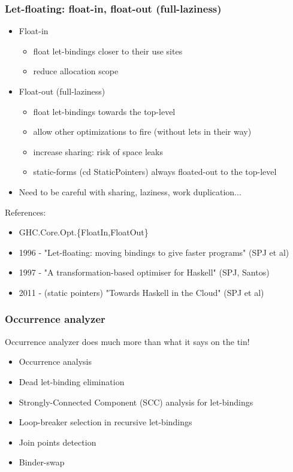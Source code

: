 \documentclass[aspectratio=169]{beamer}
\begin{document}
\begin{frame}
  \frametitle{Let-floating: float-in, float-out (full-laziness)}

  \begin{itemize}
    \item Float-in
      \begin{itemize}
        \item float let-bindings closer to their use sites
        \item reduce allocation scope
      \end{itemize}
    \item Float-out (full-laziness)
      \begin{itemize}
        \item float let-bindings towards the top-level
        \item allow other optimizations to fire (without lets in their way)
        \item increase sharing: risk of space leaks
        \item static-forms (cd StaticPointers) always floated-out to the top-level
      \end{itemize}
    \item Need to be careful with sharing, laziness, work duplication...
  \end{itemize}

  References:
  \begin{itemize}
    \item GHC.Core.Opt.\{FloatIn,FloatOut\}
    \item 1996 - "Let-floating: moving bindings to give faster programs" (SPJ et al)
    \item 1997 - "A transformation-based optimiser for Haskell" (SPJ, Santos)
    \item 2011 - (static pointers) "Towards Haskell in the Cloud" (SPJ et al)
  \end{itemize}
\end{frame}

\begin{frame}
  \frametitle{Occurrence analyzer}

  Occurrence analyzer does much more than what it says on the tin!

  \begin{itemize}
    \item Occurrence analysis
    \item Dead let-binding elimination
    \item Strongly-Connected Component (SCC) analysis for let-bindings
    \item Loop-breaker selection in recursive let-bindings
    \item Join points detection
    \item Binder-swap
  \end{itemize}
\end{frame}
\end{document}
